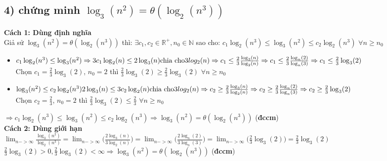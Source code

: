 \documentclass[10pt,a4paper]{article}
\begin{document}
\subsection*{4) chứng minh $\log_3(n^2) = \theta(\log_2(n^3))$}
\textbf{Cách 1: Dùng định nghĩa}\\
Giả sử $\log_3(n^2) = \theta(\log_2(n^3))$ thì: $\exists c_1, c_2 \in \mathbb{R^+},n_0 \in \mathbb{N}$ sao cho: $c_1\log_2(n^3)\leq \log_3(n^2)\leq c_2\log_2(n^3)$ $\forall n \geq n_0$\\
\begin{itemize}
    \item $c_1\log_2(n^3)\leq \log_3(n^2) \Rightarrow 3c_1\log_2(n) \leq 2\log_3(n)\\
    \text{chia cho}  3log_2(n) \\
    \Rightarrow c_1 \leq \frac{2}{3}\frac{\log_3(n)}{\log_2(n)}\\
    \Rightarrow c_1 \leq \frac{2}{3}\frac{\log_n(2)}{\log_n(3)}\\
    \Rightarrow c_1 \leq \frac{2}{3}\log_3(2)$\\
    Chọn $c_1 = \frac{2}{3}\log_3(2)$, $n_0 = 2$ thì $\frac{2}{3}\log_3(2) \geq  \frac{2}{3}\log_3(2)$ $\forall n\geq n_0$
    \item $\log_3(n^2)\leq c_2\log_2(n^3) 2\log_3(n)\leq 3c_2\log_2(n)\\
    \text{chia cho}  3log_2(n) \\
    \Rightarrow c_2 \geq \frac{2}{3}\frac{\log_3(n)}{\log_2(n)}\\
    \Rightarrow c_2 \geq \frac{2}{3}\frac{\log_n(2)}{\log_n(3)}\\
    \Rightarrow c_2 \geq \frac{2}{3}\log_3(2)$\\
    Chọn $c_2 = \frac{2}{3}$, $n_0 = 2$ thì $\frac{2}{3}\log_3(2) \leq  \frac{2}{3}$ $\forall n\geq n_0$
\end{itemize}
$ \Rightarrow c_1\log_2(n^3)\leq \log_3(n^2)\leq c_2\log_2(n^3) \Rightarrow \log_3(n^2) = \theta(\log_2(n^3))$ (\textbf{đccm})\\
\textbf{Cách 2: Dùng giới hạn}\\
$\lim_{n->\infty}\frac{\log_3(n^2)}{\log_2(n^3)} = \lim_{n->\infty}\big(\frac{2\log_3(n)}{3\log_2(n)}\big)= \lim_{n->\infty}\big(\frac{2\log_n(2)}{3\log_n(3)}\big) = \lim_{n->\infty}\big(\frac{2}{3}\log_3(2)\big) = \frac{2}{3}\log_3(2)$ \\
$\frac{2}{3}\log_3(2) > 0, \frac{2}{3}\log_3(2) < \infty \Rightarrow \log_3(n^2) = \theta(\log_2(n^3))$ (\textbf{đccm})\\
\end{document}
